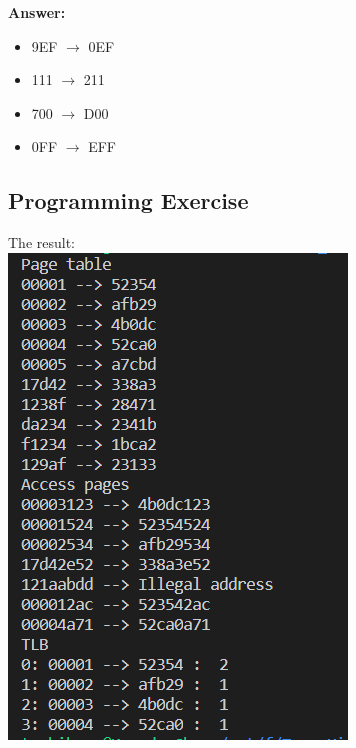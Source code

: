 \documentclass[a4paper, 11pt]{article}
\newcommand{\tf}{\textbf}
\newcommand{\rarrow}{\rightarrow}
\begin{document}
\newpage

\tf{Answer: }
\begin{itemize}
    \item 9EF $\rarrow$ 0EF
    \item 111 $\rarrow$ 211
    \item 700 $\rarrow$ D00
    \item 0FF $\rarrow$ EFF
\end{itemize}

\subsection{Programming Exercise}

\par{The result: } \\

\bigbreak
\includegraphics[scale = 0.7]{result.png}
\bigbreak
\end{document}
